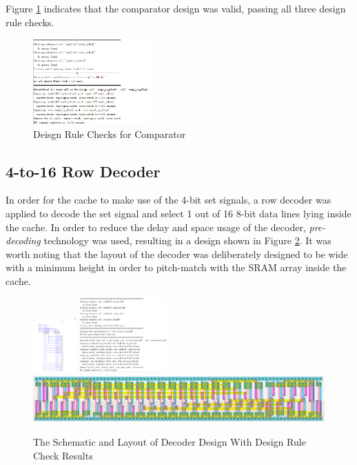 \documentclass[conference]{IEEEtran}
\begin{document}
Figure \ref{fig:comparator_check} indicates that the comparator design was valid, passing all three design rule checks.
\begin{figure}[h!]
  \centering
    \includegraphics[width=0.4\textwidth]{comparator_check}
  \caption{Deisgn Rule Checks for Comparator}
  \label{fig:comparator_check}
\end{figure}

\subsection{4-to-16 Row Decoder}\label{subsec:decoder}
In order for the cache to make use of the 4-bit set signals, a row decoder was applied to decode the set signal and select 1 out of 16 8-bit data lines lying inside the cache. In order to reduce the delay and space usage of the decoder, \textit{pre-decoding} technology was used, resulting in a design shown in Figure \ref{fig:decoder}. It was worth noting that the layout of the decoder was deliberately designed to be wide with a minimum height in order to pitch-match with the SRAM array inside the cache.
\begin{figure}[h!]
  \centering
    \includegraphics[width=0.15\textwidth]{decoder_sch} \includegraphics[width=0.3\textwidth]{decoder_check} \includegraphics[scale=0.25]{decoder_lay}
  \caption{The Schematic and Layout of Decoder Design With Design Rule Check Results}
  \label{fig:decoder}
\end{figure}
\end{document}
